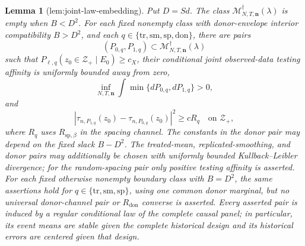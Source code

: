 \documentclass{article}
\newtheorem{lemma}{Lemma}
\begin{document}
\begin{lemma}[lem:joint-law-embedding]\label{lem:joint-law-embedding}
Put \(D=Sd\).  The class \(\mathcal M_{N,T,\mathbf n}^{\dagger}(\lambda)\) is empty when \(B<D^2\).  For each fixed nonempty class with donor-envelope interior compatibility \(B>D^2\), and each \(q\in\{\mathrm{tr},\mathrm{sm},\mathrm{sp},\mathrm{don}\}\), there are pairs
\[
(P_{0,q},P_{1,q})\subset
\mathcal M_{N,T,\mathbf n}^{\dagger}(\lambda)
\]
such that \(P_{\ell,q}(z_0\in\mathcal Z_+\mid E_0)\ge c_X\), their conditional joint observed-data testing affinity is uniformly bounded away from zero,
\[
\inf_{N,T,\mathbf n}\int\min\{dP_{0,q},dP_{1,q}\}>0,
\]
and
\[
|\tau_{n,P_{1,q}}(z_0)-\tau_{n,P_{0,q}}(z_0)|^2
\ge cR_q
\quad\text{on }\mathcal Z_+,
\]
where \(R_q\) uses \(R_{\mathrm{sp},\beta}\) in the spacing channel.  The constants in the donor pair may depend on the fixed slack \(B-D^2\).  The treated-mean, replicated-smoothing, and donor pairs may additionally be chosen with uniformly bounded Kullback--Leibler divergence; for the random-spacing pair only positive testing affinity is asserted.  For each fixed otherwise nonempty boundary class with \(B=D^2\), the same assertions hold for \(q\in\{\mathrm{tr},\mathrm{sm},\mathrm{sp}\}\), using one common donor marginal, but no universal donor-channel pair or \(R_{\mathrm{don}}\) converse is asserted.  Every asserted pair is induced by a regular conditional law of the complete causal panel; in particular, its event means are stable given the complete historical design and its historical errors are centered given that design.
\end{lemma}
\end{document}
